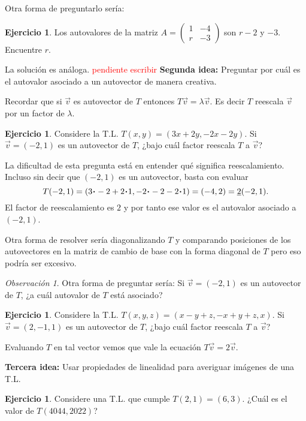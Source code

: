 \documentclass[12pt]{article}
\theoremstyle{plain}
\theoremstyle{definition}
\newtheorem{Ej}[Th]{Ejercicio}         %
\theoremstyle{remark}
\newtheorem*{Rmk}{Observación}      %
\newcommand{\la}{\lambda}           %
\renewcommand{\:}{\colon}           %
\newcommand{\un}[1]{\underline{#1}}
\renewcommand{\.}{\Cdot}                %
\newcommand{\twobytwo}[4]{\begin{pmatrix} %
    #1 & #2 \\ #3 & #4 \end{pmatrix}}
\newcommand{\red}[1]{\textcolor{red}{#1}}
\begin{document}
Otra forma de preguntarlo sería:

\begin{Ej}
  Los autovalores de la matriz $A=\twobytwo{1}{-4}{r}{-3}$ son $r-2$ y $-3$. Encuentre $r$.
\end{Ej}
La solución es análoga. \red{pendiente escribir}
\newpage
\textbf{Segunda idea:} Preguntar por cuál es el autovalor asociado a un autovector de manera creativa.\par 
Recordar que si $\vec{v}$ es autovector de $T$ entonces $T\vec v=\la\vec{v}$. Es decir $T$ reescala $\vec v$ por un factor de $\la$.

\begin{Ej}
  Considere la T.L. $T(x,y)=(3x+2y,-2x-2y)$. Si $\vec{v}=(-2,1)$ es un autovector de $T$, ¿bajo cuál factor reescala $T$ a $\vec v$?
\end{Ej}

La dificultad de esta pregunta está en entender qué significa reescalamiento. Incluso sin decir que $(-2,1)$ es un autovector, basta con evaluar 
$$T(-2,1)=(3\.-2+2\.1,-2\.-2-2\.1)=(-4,2)=\un{2}(-2,1).$$
El factor de reescalamiento es $2$ y por tanto ese valor es el autovalor asociado a $(-2,1)$.\par 
Otra forma de resolver sería diagonalizando $T$ y comparando posiciones de los autovectores en la matriz de cambio de base con la forma diagonal de $T$ pero eso podría ser excesivo.

\begin{Rmk}
Otra forma de preguntar sería: Si $\vec{v}=(-2,1)$ es un autovector de $T$, ¿a cuál autovalor de $T$ está asociado?
\end{Rmk}

\begin{Ej}
  Considere la T.L. $T(x,y,z)=(x-y+z,-x+y+z,x)$. Si $\vec{v}=(2,-1,1)$ es un autovector de $T$, ¿bajo cuál factor reescala $T$ a $\vec v$?
\end{Ej}

Evaluando $T$ en tal vector vemos que vale la ecuación $T\vec v=2\vec v$.\vspace*{1em}

\textbf{Tercera idea:} Usar propiedades de linealidad para averiguar imágenes de una T.L.

\begin{Ej}
  Considere una T.L. que cumple $T(2,1)=(6,3)$. ¿Cuál es el valor de $T(4044,2022)$?
\end{Ej}
\end{document}
